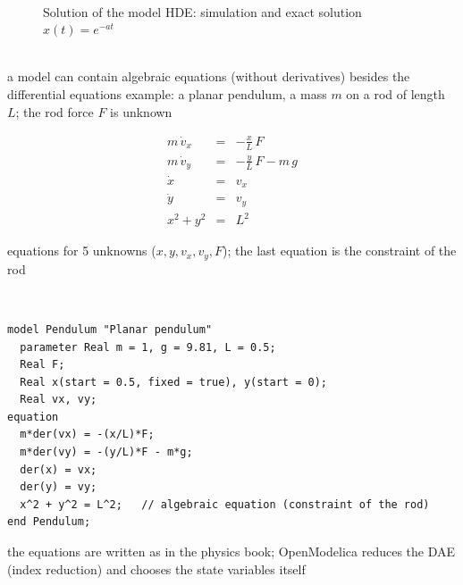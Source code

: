 \begin{description}
\begin{figure}[!hbtp]
     \begin{center}
	  \\
	  \caption{Solution of the model HDE: simulation and exact solution $x(t) = e^{-a t}$}
     \end{center}
\end{figure}
\os{\newpage}

\item[{\rot\bf Differential-algebraic equations: the pendulum}]~\\[-\lblskip]
\bi
	\ite a model can contain algebraic equations (without derivatives) besides the differential equations
	\ite example: a planar pendulum, a mass $m$ on a rod of length $L$; the rod force $F$ is unknown
\ei
\begin{minipage}{0.3\textwidth}
\begin{center}
\end{center}
\end{minipage}
\begin{minipage}{0.65\textwidth}
\begin{eqnarray*}
m\,\dot{v}_x &=& -\frac{x}{L}\,F \\
m\,\dot{v}_y &=& -\frac{y}{L}\,F - m\,g \\
\dot{x} &=& v_x \\
\dot{y} &=& v_y \\
x^2 + y^2 &=& L^2
\end{eqnarray*}
\end{minipage}
\bi
	 equations for 5 unknowns ($x, y, v_x, v_y, F$); the last equation is the constraint of the rod
\ei
\os{\newpage}

\item[{\rot\bf The pendulum in Modelica}]~\\[-\lstskip]
\begin{lstlisting}[language={}]
model Pendulum "Planar pendulum"
  parameter Real m = 1, g = 9.81, L = 0.5;
  Real F;
  Real x(start = 0.5, fixed = true), y(start = 0);
  Real vx, vy;
equation
  m*der(vx) = -(x/L)*F;
  m*der(vy) = -(y/L)*F - m*g;
  der(x) = vx;
  der(y) = vy;
  x^2 + y^2 = L^2;   // algebraic equation (constraint of the rod)
end Pendulum;
\end{lstlisting}
\bi
	\ite the equations are written as in the physics book; OpenModelica reduces the DAE (index reduction) and chooses the state variables itself
\ei
\os{\newpage}


\end{description}
